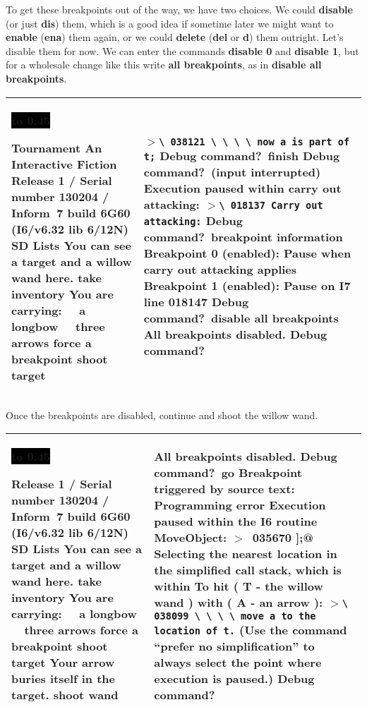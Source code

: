 \documentclass{book}
\newcommand{\n}{\hspace*{\fill}\newline}
\newcommand{\terp}[2]{\begin{center}\begin{tabular}{p{0.45\textwidth}|p{0.45\textwidth}}\midrule #1&#2\\\midrule\end{tabular}\end{center}}
\newcommand{\glkheading}[1]{\textbf{#1}}
\newcommand{\glkinput}[1]{\textbf{#1}}
\newcommand{\glkstatusline}[2]{\centerline{\colorbox{black}{\hbox to 0.45\textwidth{\textcolor{white}{#1\hfil #2}}}}}
\newcommand{\storyprompt}{\raisebox{1.5pt}{\(>\)}}
\newcommand{\cursor}{\raisebox{-1.5pt}{\RectangleThin}}
\newcommand{\markedindent}{\(>\)}
\begin{document}
To get these breakpoints out of the way, we have two choices.  We could
\glkinput{disable} (or just \glkinput{dis}) them, which is a good idea if
sometime later we might want to \glkinput{enable} (\glkinput{ena}) them again,
or we could \glkinput{delete} (\glkinput{del} or \glkinput{d}) them outright.
Let's disable them for now.  We can enter the commands \glkinput{disable 0} and
\glkinput{disable 1}, but for a wholesale change like this write \glkinput{all
  breakpoints}, as in \glkinput{disable all breakpoints}.

\terp{\glkstatusline{Lists}{0/2}\n
  \glkheading{Tournament}\n
  An Interactive Fiction\n
  Release 1 / Serial number 130204 / Inform~7 build 6G60 (I6/v6.32 lib 6/12N) SD\n
  \n
  \glkheading{Lists}\n
  You can see a target and a willow wand here.\n
  \n
  \storyprompt\glkinput{take inventory}\n
  You are carrying:\n
  \null\ \ a longbow\n
  \null\ \ three arrows\n
  \n
  \storyprompt\glkinput{force a breakpoint}\n
  \storyprompt\glkinput{shoot target}}{%
  \markedindent \lstinline{\ 038121 \ \ \ \ now a is part of t;}\n
  \n
  Debug command?\ \glkinput{finish}\n
  \n
  Debug command?\ (input interrupted)\n
  \n
  Execution paused within carry out attacking:\n
  \markedindent \lstinline{\ 018137 Carry out attacking:}\n
  \n
  Debug command?\ \glkinput{breakpoint information}\n
  \n
  Breakpoint 0 (enabled): Pause when carry out attacking applies\n
  Breakpoint 1 (enabled): Pause on I7 line 018147\n
  \n
  Debug command?\ \glkinput{disable all breakpoints}\n
  \n
  All breakpoints disabled.\n
  \n
  Debug command?\ \cursor}

Once the breakpoints are disabled, continue and shoot the willow wand.

\terp{\glkstatusline{Lists}{0/3}\n
  Release 1 / Serial number 130204 / Inform~7 build 6G60 (I6/v6.32 lib 6/12N) SD\n
  \n
  \glkheading{Lists}\n
  You can see a target and a willow wand here.\n
  \n
  \storyprompt\glkinput{take inventory}\n
  You are carrying:\n
  \null\ \ a longbow\n
  \null\ \ three arrows\n
  \n
  \storyprompt\glkinput{force a breakpoint}\n
  \storyprompt\glkinput{shoot target}\n
  Your arrow buries itself in the target.\n
  \n
  \storyprompt\glkinput{shoot wand}\n
  \n
  [** Programming error: tried to ``move'' arrow to nothing **]}{%
  All breakpoints disabled.\n
  \n
  Debug command?\ \glkinput{go}\n
  \n
  \glkheading{Breakpoint triggered by source text:} Programming error\n
  \n
  Execution paused within the I6 routine MoveObject:\n
  \markedindent \lstinline@\ 035670 ];@\n
  \n
  Selecting the nearest location in the simplified call stack, which is within To hit ( T - the willow wand ) with ( A - an arrow ):\n
  \markedindent \lstinline{\ 038099 \ \ \ \ move a to the location of t.}\n
  \n
  (Use the command ``prefer no simplification'' to always select the point where execution is paused.)\n
  \n
  Debug command?\ \cursor}
\end{document}
